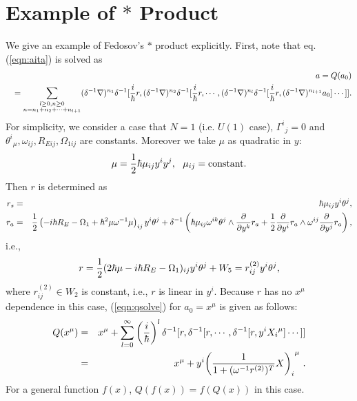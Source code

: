 \documentclass[10pt,a4paper]{article}
\def\h{\hbar}
\begin{document}
\section{Example of $*$ Product
\label{sec:ex}}
We give an example of Fedosov's $*$ product explicitly.
First, note that eq.(\ref{eqn:aita}) is solved as
\begin{eqnarray}
\label{eqn:qsolve}
&&a=Q(a_0)\nonumber\\
&&=\sum_{
\begin{subarray}{c}
l\geq0,n\geq0\\
n=n_1+n_2+\cdots+n_{l+1}
\end{subarray}
}(\delta^{-1}\nabla)^{n_1}\delta^{-1}[{i\over\h}r,(\delta^{-1}\nabla)^{n_2}\delta^{-1}[{i\over\h}r,\cdots,(\delta^{-1}\nabla)^{n_l}\delta^{-1}[{i\over\h}r,(\delta^{-1}\nabla)^{n_{l+1}}a_0]\cdots]].\nonumber\\
\end{eqnarray}
For simplicity, we consider a case that $N=1$ (i.e. $U(1)$ case), ${\Gamma^i}_j=0$ and ${\theta^i}_{\mu},\omega_{ij},R_{Eij},\Omega_{1ij}$ are constants.
Moreover we take $\mu$ as quadratic in $y$:
\begin{equation}
\mu=\frac12 \h \mu_{ij}y^i y^j,\ \ \mu_{ij}={\rm constant}.
\end{equation}
Then $r$ is determined as
\begin{eqnarray}
r_s&=&\h \mu_{ij}y^i\theta^j,\nonumber\\
r_a&=&{1\over2}\left(-i\h R_E-\Omega_1+\h^2\mu\omega^{-1}\mu\right)_{ij}y^i\theta^j+\delta^{-1}\left(\h \mu_{ij}\omega^{ik}\theta^j\wedge{\partial\over\partial y^k}r_a+{1\over2}{\partial\over\partial y^i}r_a\wedge\omega^{ij}{\partial\over\partial y^j}r_a\right),\nonumber\\
\end{eqnarray}
i.e.,
\begin{equation}
\label{eqn:rapro}
r={1\over2}(2\h \mu -i\h R_E-\Omega_1)_{ij}y^i\theta^j+W_5=r^{(2)}_{ij}y^i\theta^j,
\end{equation}
where $r^{(2)}_{ij}\in W_2$ is constant, i.e., $r$ is linear in $y^i$.
Because $r$ has no $x^\mu$ dependence in this case, (\ref{eqn:qsolve}) for $a_0=x^\mu$ is given as follows:
\begin{eqnarray}
Q(x^\mu)&=&x^\mu+\sum_{l=0}^\infty\left(i\over\h\right)^l\delta^{-1}[r,\delta^{-1}[r,\cdots,\delta^{-1}[r,y^i{X_i}^\mu]\cdots]]\nonumber\\
&=&x^\mu+y^i{\left({1\over1+(\omega^{-1}r^{(2)})^T}X\right)_i}^\mu \ .
\end{eqnarray}
For a general function $f(x)$, $Q(f(x))=f(Q(x))$ in this case.\\
\end{document}

